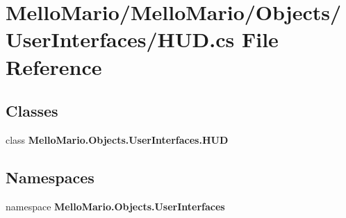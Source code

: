 \section{Mello\+Mario/\+Mello\+Mario/\+Objects/\+User\+Interfaces/\+H\+UD.cs File Reference}
\label{HUD_8cs}
\subsection*{Classes}
\begin{DoxyCompactItemize}
\item 
class \textbf{ Mello\+Mario.\+Objects.\+User\+Interfaces.\+H\+UD}
\end{DoxyCompactItemize}
\subsection*{Namespaces}
\begin{DoxyCompactItemize}
\item 
namespace \textbf{ Mello\+Mario.\+Objects.\+User\+Interfaces}
\end{DoxyCompactItemize}
